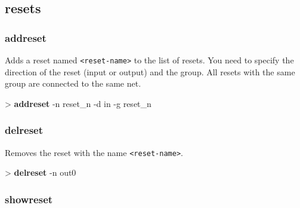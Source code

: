 \documentclass[10pt,a4paper]{article}
\begin{document}
\subsection{resets}
\subsubsection{addreset}
\label{subsec:addreset}

Adds a reset named \texttt{<reset-name>} to the list of resets. You need to specify the direction of the reset (input or output) and the group. All resets with the same group are connected to the same net.\\


\begin{sampletitle}
> \textbf{\tool{} addreset} -n reset\_n -d in -g reset\_n
\end{sampletitle}


\subsubsection{delreset}
\label{subsec:delreset}

Removes the reset with the name \texttt{<reset-name>}.\\


\begin{sampletitle}
> \textbf{\tool{} delreset} -n out0
\end{sampletitle}


\subsubsection{showreset}
\label{subsec:showreset}
\end{document}
